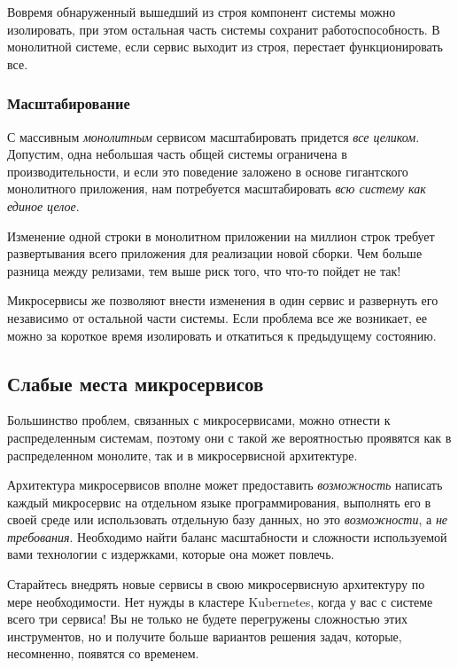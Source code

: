 \documentclass[%
	11pt,
	a4paper,
	utf8,
		]{article}
\begin{document}
Вовремя обнаруженный вышедший из строя компонент системы можно изолировать, при этом остальная часть системы сохранит работоспособность. В монолитной системе, если сервис выходит из строя, перестает функционировать все.

\subsubsection{Масштабирование}

С массивным \emph{монолитным} сервисом масштабировать придется \emph{все целиком}. Допустим, одна небольшая часть общей системы ограничена в производительности, и если это поведение заложено в основе гигантского монолитного приложения, нам потребуется масштабировать \emph{всю систему как единое целое}. 

Изменение одной строки в монолитном приложении на миллион строк требует развертывания всего приложения для реализации новой сборки. Чем больше разница между релизами, тем выше риск того, что что-то пойдет не так!

Микросервисы же позволяют внести изменения в один сервис и развернуть его независимо от остальной части системы. Если проблема все же возникает, ее можно за короткое время изолировать и откатиться к предыдущему состоянию.

\subsection{Слабые места микросервисов}

Большинство проблем, связанных с микросервисами, можно отнести к распределенным системам, поэтому они с такой же вероятностью проявятся как в распределенном монолите, так и в микросервисной архитектуре.

Архитектура микросервисов вполне может предоставить \emph{возможность} написать каждый микросервис на отдельном языке программирования, выполнять его в своей среде или использовать отдельную базу данных, но это \emph{возможности}, а \emph{не требования}. Необходимо найти баланс масштабности и сложности используемой вами технологии с издержками, которые она может повлечь.

Старайтесь внедрять новые сервисы в свою микросервисную архитектуру по мере необходимости. Нет нужды в кластере Kubernetes, когда у вас с системе всего три сервиса! Вы не только не будете перегружены сложностью этих инструментов, но и получите больше вариантов решения задач, которые, несомненно, появятся со временем.
\end{document}
